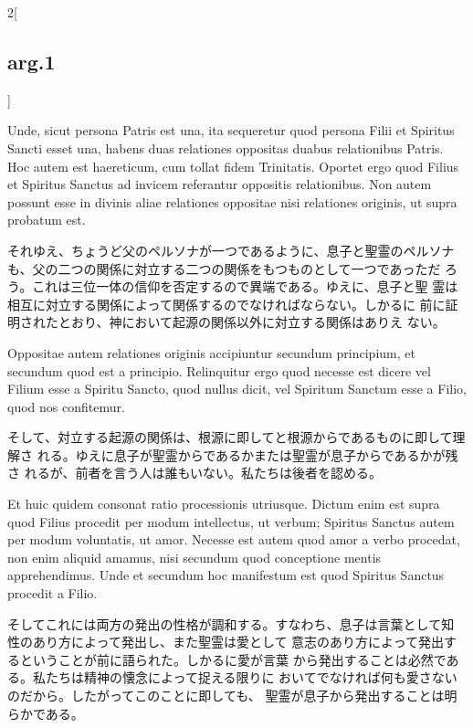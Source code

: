 \documentclass[paper=a4paper,fontsize=10pt,jafontsize=9pt,titlepage]{jlreq}
\begin{document}
\begin{paracol}{2}[\subsection{arg.1}]
\switchcolumn*

Unde, sicut persona Patris est una, ita sequeretur quod
persona Filii et  Spiritus Sancti esset una, habens duas relationes
oppositas duabus relationibus Patris. Hoc autem est haereticum, cum
tollat fidem Trinitatis. Oportet ergo quod Filius et  Spiritus Sanctus ad invicem referantur oppositis relationibus. Non
autem possunt esse in divinis aliae relationes oppositae nisi
relationes originis, ut supra probatum est.

\switchcolumn

それゆえ、ちょうど父のペルソナが一つであるように、息子と聖霊のペルソナ
 も、父の二つの関係に対立する二つの関係をもつものとして一つであっただ
 ろう。これは三位一体の信仰を否定するので異端である。ゆえに、息子と聖
 霊は相互に対立する関係によって関係するのでなければならない。しかるに
 前に証明されたとおり、神において起源の関係以外に対立する関係はありえ
 ない。

\switchcolumn*

Oppositae autem relationes
originis accipiuntur secundum principium, et secundum quod est a
principio. Relinquitur ergo quod necesse est dicere vel Filium esse a
 Spiritu Sancto, quod nullus dicit, vel  Spiritum Sanctum esse a Filio,
quod nos confitemur.

\switchcolumn

そして、対立する起源の関係は、根源に即してと根源からであるものに即して理解さ
 れる。ゆえに息子が聖霊からであるかまたは聖霊が息子からであるかが残さ
 れるが、前者を言う人は誰もいない。私たちは後者を認める。

\switchcolumn*

Et huic quidem consonat ratio processionis
utriusque. Dictum enim est supra quod Filius procedit per modum
intellectus, ut verbum; Spiritus Sanctus autem per modum
voluntatis, ut amor. Necesse est autem quod amor a verbo procedat, non
enim aliquid amamus, nisi secundum quod conceptione mentis
apprehendimus. Unde et secundum hoc manifestum est quod
 Spiritus Sanctus procedit a Filio.

\switchcolumn

そしてこれには両方の発出の性格が調和する。すなわち、息子は言葉として知
 性のあり方によって発出し、また聖霊は愛として
意志のあり方によって発出するということが前に語られた。しかるに愛が言葉
 から発出することは必然である。私たちは精神の懐念によって捉える限りに
 おいてでなければ何も愛さないのだから。したがってこのことに即しても、
 聖霊が息子から発出することは明らかである。

\switchcolumn*


\end{paracol}
\end{document}
